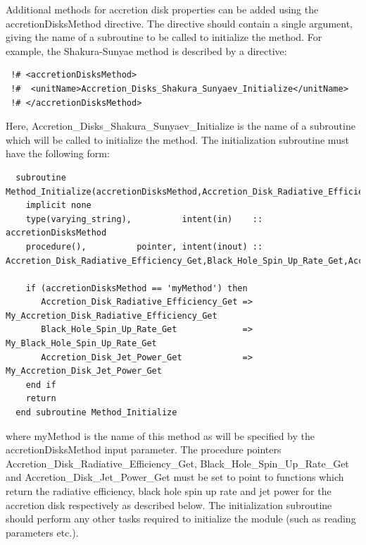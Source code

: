 Additional methods for accretion disk properties can be added using the {\normalfont \ttfamily accretionDisksMethod} directive. The directive should contain a single argument, giving the name of a subroutine to be called to initialize the method. For example, the {\normalfont \ttfamily Shakura-Sunyae} method is described by a directive:
\begin{verbatim}
 !# <accretionDisksMethod>
 !#  <unitName>Accretion_Disks_Shakura_Sunyaev_Initialize</unitName>
 !# </accretionDisksMethod>
\end{verbatim}
Here, {\normalfont \ttfamily Accretion\_Disks\_Shakura\_Sunyaev\_Initialize} is the name of a subroutine which will be called to initialize the method. The initialization subroutine must have the following form:
\begin{verbatim}
  subroutine Method_Initialize(accretionDisksMethod,Accretion_Disk_Radiative_Efficiency_Get,Black_Hole_Spin_Up_Rate_Get,Accretion_Disk_Jet_Power_Get)
    implicit none
    type(varying_string),          intent(in)    :: accretionDisksMethod
    procedure(),          pointer, intent(inout) :: Accretion_Disk_Radiative_Efficiency_Get,Black_Hole_Spin_Up_Rate_Get,Accretion_Disk_Jet_Power_Get
    
    if (accretionDisksMethod == 'myMethod') then
       Accretion_Disk_Radiative_Efficiency_Get => My_Accretion_Disk_Radiative_Efficiency_Get
       Black_Hole_Spin_Up_Rate_Get             => My_Black_Hole_Spin_Up_Rate_Get
       Accretion_Disk_Jet_Power_Get            => My_Accretion_Disk_Jet_Power_Get
    end if
    return
  end subroutine Method_Initialize
\end{verbatim}
where {\normalfont \ttfamily myMethod} is the name of this method as will be specified by the {\normalfont \ttfamily accretionDisksMethod} input parameter. The procedure pointers {\normalfont \ttfamily Accretion\_Disk\_Radiative\_Efficiency\_Get}, {\normalfont \ttfamily Black\_Hole\_Spin\_Up\_Rate\_Get} and {\normalfont \ttfamily Accretion\_Disk\_Jet\_Power\_Get} must be set to point to functions which return the radiative efficiency, black hole spin up rate and jet power for the accretion disk respectively as described below. The initialization subroutine should perform any other tasks required to initialize the module (such as reading parameters etc.).


